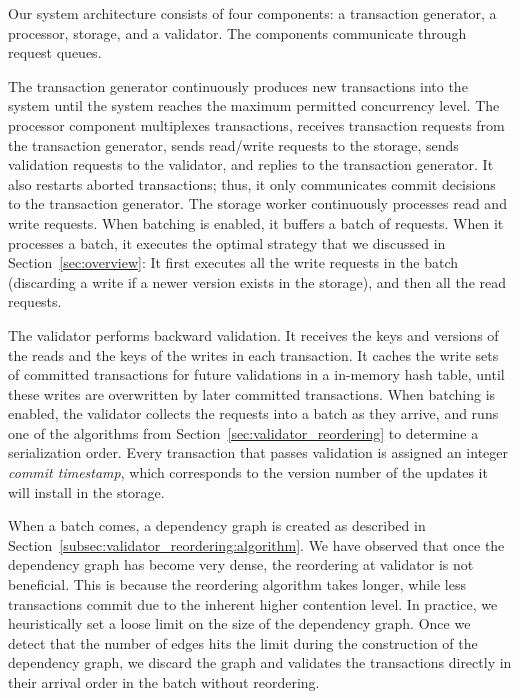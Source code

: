 Our system architecture consists of four components: a transaction generator, a processor, storage, and a validator. The components communicate through request queues.

The transaction generator continuously produces new transactions into the system until the system reaches the maximum permitted concurrency level. The processor component multiplexes transactions, receives transaction requests from the transaction generator, sends read/write requests to the storage, sends validation requests to the validator, and replies to the transaction generator. It also restarts aborted transactions; thus, it only communicates commit decisions to the transaction generator. 
The storage worker continuously processes read and write requests. When batching is enabled, it buffers a batch of requests. When it processes a batch, it executes the optimal strategy that we discussed in Section~\ref{sec:overview}: It first executes all the write requests in the batch (discarding a write if a newer version exists in the storage), and then all the read requests. 

The validator performs backward validation. It receives the keys and versions of the reads and the keys of the writes in each transaction. It caches the write sets of committed transactions for future validations in a in-memory hash table, until these writes are overwritten by later committed transactions. 
When batching is enabled, the validator collects the requests into a batch as they arrive, and runs one of the algorithms from Section~\ref{sec:validator_reordering} to determine a serialization order. Every transaction that passes validation is assigned an integer \emph{commit timestamp}, which corresponds to the version number of the updates it will install in the storage.

When a batch comes, a dependency graph is created as described in Section~\ref{subsec:validator_reordering:algorithm}. We have observed that once the dependency graph has become very dense, the reordering at validator is not beneficial. This is because the reordering algorithm takes longer, while less transactions commit due to the inherent higher contention level. In practice, we heuristically set a loose limit on the size of the dependency graph. Once we detect that the number of edges hits the limit during the construction of the dependency graph, we discard the graph and validates the transactions directly in their arrival order in the batch without reordering.

